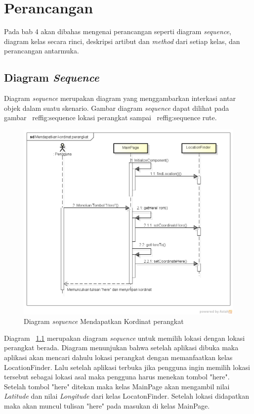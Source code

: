\chapter{Perancangan}
\label{chap:Perancangan}

Pada bab 4 akan dibahas mengenai perancangan seperti diagram \textit{sequence}, diagram kelas secara rinci, deskripsi artibut dan \textit{method} dari setiap kelas, dan perancangan antarmuka.

\section{Diagram \textit{Sequence}}
\label{lab:Diagram Sequence}
\hspace{0.5cm} Diagram \textit{sequence} merupakan diagram yang menggambarkan interkasi antar objek dalam suatu skenario. Gambar diagram \textit{sequence} dapat dilihat pada gambar ~ref{fig:sequence lokasi perangkat} sampai ~ref{fig:sequence rute}. 

\begin{figure}[h]
	\centering
		\includegraphics[scale=0.4]{Gambar/sequence/MendapatkanKordinatPerangkat}
	\caption{Diagram \textit{sequence} Mendapatkan Kordinat perangkat}
	\label{fig:sequence lokasi perangkat}
\end{figure}

\hspace{0.5cm} Diagram ~\ref{fig:sequence lokasi perangkat} merupakan diagram \textit{sequence} untuk memilih lokasi dengan lokasi perangkat berada. Diagram menunjukan bahwa setelah aplikasi dibuka maka aplikasi akan mencari dahulu lokasi perangkat dengan memanfaatkan kelas LocationFinder. Lalu setelah aplikasi terbuka jika pengguna ingin memilih lokasi tersebut sebagai lokasi asal maka pengguna harus menekan tombol "here". Setelah tombol "here" ditekan maka kelas MainPage akan mengambil nilai \textit{Latitude} dan nilai \textit{Longitude} dari kelas LocatonFinder. Setelah lokasi didapatkan maka akan muncul tulisan "here" pada masukan di kelas MainPage.

